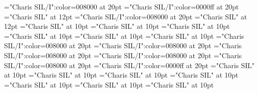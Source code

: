\documentclass[a4paper]{article}
\begin{document}
\pagestyle{plain}
\sloppy
\setlength{\parfillskip}{0pt plus 1fil}
\font\pronunciationenUSpronunciationarticlebefore="Charis SIL/I":color=008000 at 20pt
\font\pronunciationenUKpronunciationenUSbefore="Charis SIL/I":color=0000ff at 20pt
\font\pronunciationenUSfirstoftypebefore="Charis SIL" at 12pt
\font\pronunciationenUSpronunciationbefore="Charis SIL/I":color=008000 at 20pt
\font\pronunciationenUSbefore="Charis SIL" at 12pt
\font\sectionletterdictionary="Charis SIL" at 10pt
\font\headsectionletterdictionary="Charis SIL" at 10pt
\font\articledictionary="Charis SIL" at 10pt
\font\firstoftypeheadwordlastoftypearticledictionary="Charis SIL" at 10pt
\font\firstoftypegrammarrequireslastoftypearticledictionary="Charis SIL" at 10pt
\font\firstoftypelastoftyperelationsynonymarticledictionary="Charis SIL" at 10pt
\font\firstoftypepronunciationenUKarticledictionary="Charis SIL/I":color=008000 at 20pt
\font\pronunciationfirstoftypebeforearticledictionary="Charis SIL/I":color=008000 at 20pt
\font\firstoftypepronunciationenUSarticledictionary="Charis SIL/I":color=008000 at 20pt
\font\pronunciationenUSfirstoftypebeforearticledictionary="Charis SIL/I":color=008000 at 20pt
\font\lastoftypepronunciationenUKarticledictionary="Charis SIL/I":color=008000 at 20pt
\font\pronunciationenUKpronunciationenUSbeforearticledictionary="Charis SIL/I":color=0000ff at 20pt
\font\firstoftypegrammarcategorylastoftypearticledictionary="Charis SIL" at 10pt
\font{}="Charis SIL" at 10pt
\font\firstoftypelastoftypenotearticledictionary="Charis SIL" at 10pt
\font\exampleusefirstoftypearticledictionary="Charis SIL" at 10pt
\font\examplefirstoftypearticledictionary="Charis SIL" at 10pt
\font\exampleuselastoftypearticledictionary="Charis SIL" at 10pt
\font\examplelastoftypearticledictionary="Charis SIL" at 10pt

\newpage 
\thispagestyle{empty} 
\mbox{} 
\newpage 
\newpage 
\setcounter{page}{1} 
\pagestyle{fancy} 


\end{document}
